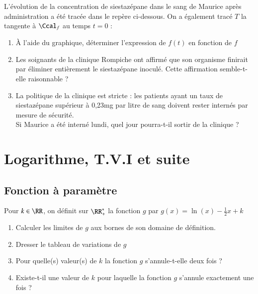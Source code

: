 \documentclass[oneside,12pt]{article}
\let\oldsection\section
\renewcommand{\section}{\newpage\oldsection}
\begin{document}
L'évolution de la concentration de siestazépane dans le sang de Maurice après administration a été tracée dans le repère ci-dessous. On a également tracé $T$ la tangente à $\Ccal_f$ au temps $t=0$ :

\begin{center}
\end{center}
\begin{enumerate}
    \item[6.] À l'aide du graphique, déterminer l'expression de $f(t)$ en fonction de $f$
    \item[7.] Les soignants de la clinique Rompiche ont affirmé que son organisme finirait par éliminer entièrement le siestazépane inoculé. Cette affirmation semble-t-elle raisonnable ?
    \item[8.] La politique de la clinique est stricte : les patients ayant un taux de siestazépane supérieur à 0,23mg par litre de sang doivent rester internés par mesure de sécurité.\\
    Si Maurice a été interné lundi, quel jour pourra-t-il sortir de la clinique ?
\end{enumerate}






\section{Logarithme, T.V.I et suite}
\subsection{Fonction à paramètre}
Pour $k\in\RR$, on définit sur $\RR^*_+$ la fonction $g$ par $g(x)=\ln(x)-\frac{1}{2}x+k$
\begin{enumerate}
    \item Calculer les limites de $g$ aux bornes de son domaine de définition.
    \item Dresser le tableau de variations de $g$
    \item Pour quelle(s) valeur(s) de $k$ la fonction $g$ s'annule-t-elle deux fois ?
    \item Existe-t-il une valeur de $k$ pour laquelle la fonction $g$ s'annule exactement une fois ?
\end{enumerate}
\end{document}
